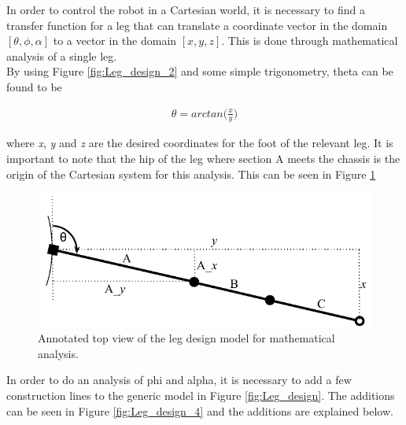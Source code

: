 In order to control the robot in a Cartesian world, it is necessary to find a transfer function for a leg that can translate a coordinate vector in the domain $[\theta,\phi,\alpha]$ to a vector in the domain $[x,y,z]$. This is done through mathematical analysis of a single leg.\\

By using Figure \ref{fig:Leg_design_2} and some simple trigonometry, theta can be found to be

\begin{align}
\label{eq:IKstart}
\theta = arctan\Big(\frac{x}{y}\Big)
\end{align}

where \textit{x}, \textit{y} and \textit{z} are the desired coordinates for the foot of the relevant leg. It is important to note that the hip of the leg where section A meets the chassis is the origin of the Cartesian system for this analysis. This can be seen in Figure \ref{fig:Leg_design_3}

\FloatBarrier
\begin{figure}[h]
\centering
\includegraphics[scale = 1]{pics/Leg_design_3.pdf}
\caption{Annotated top view of the leg design model for mathematical analysis.}
\label{fig:Leg_design_3}
\end{figure}
\FloatBarrier

In order to do an analysis of phi and alpha, it is necessary to add a few construction lines to the generic model in Figure \ref{fig:Leg_design}. The additions can be seen in Figure \ref{fig:Leg_design_4} and the additions are explained below.

